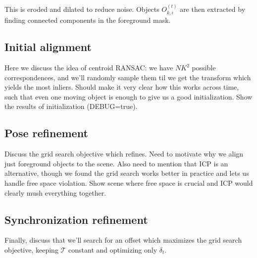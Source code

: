 \documentclass[letterpaper, 10 pt, conference]{ieeeconf}  %
\begin{document}
This is eroded and dilated to reduce noise. Objects $O_{k,i}^{(t)}$ are then extracted by finding connected components in the foreground mask.

\subsection{Initial alignment}

Here we discuss the idea of centroid RANSAC: we have $NK^2$ possible correspondences, and we'll randomly sample
them til we get the transform which yields the most inliers. Should make it very clear how this works across 
time, such that even one moving object is enough to give us a good initialization. Show the results of 
initialization (DEBUG=true).

\subsection{Pose refinement}
Discuss the grid search objective which refines. Need to motivate why we align just foreground objects to the scene. 
Also need to mention that ICP is an alternative, though we found the grid search works better in practice and lets 
us handle free space violation. Show scene where free space is crucial and ICP would clearly mush everything 
together.

\subsection{Synchronization refinement}
Finally, discuss that we'll search for an offset which maximizes the grid search objective, keeping $\mathcal{T}$ 
constant and optimizing only $\delta_t$. 


\end{document}
